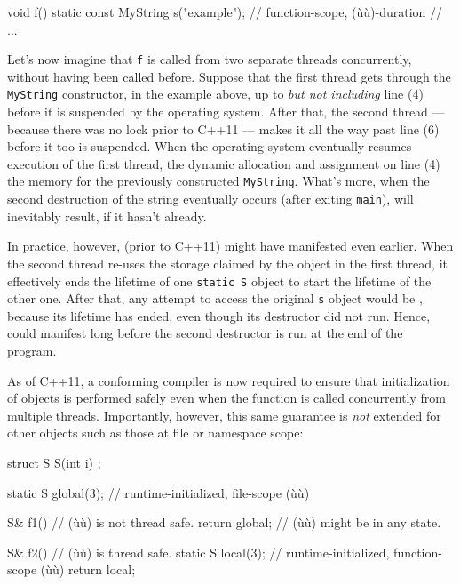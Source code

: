 \begin{emcppslisting}[emcppsbatch=e4]
void f()
{
    static const MyString s("example");  // function-scope, (ù{}ù)-duration
    // ...
}
\end{emcppslisting}

\noindent Let's now imagine that \lstinline!f! is called from
two separate threads concurrently, without having been called before. Suppose that the first thread gets
through the \lstinline!MyString! constructor, in the example above, up to
\emph{but not including} line (4) before it is suspended by the
operating system. After that, the second thread --- because there was no
lock prior to C++11 --- makes it all the way past line (6) before it too
is suspended. When the operating system eventually resumes execution of
the first thread, the dynamic allocation and assignment on line (4)
 the memory for the previously constructed
\lstinline!MyString!. What's more, when the second destruction of the
string eventually occurs (after exiting \lstinline!main!),
 will inevitably result, if it hasn't
already.

In practice, however,  (prior to C++11) might
have manifested even earlier. When the second thread re-uses the storage
claimed by the object in the first thread, it effectively ends the
lifetime of one \lstinline!static!~\lstinline!S! object to start the lifetime
of the other one. After that, any attempt to access the original
\lstinline!s! object would be , because its
lifetime has ended, even though its destructor did not run. Hence,
 could manifest long before the second
destructor is run at the end of the program.

As of C++11, a conforming compiler is now required to ensure that
initialization of  
objects is performed safely even when the function is called
concurrently from multiple threads. Importantly, however, this same
guarantee is \emph{not} extended for other 
objects such as those at file or namespace scope:

\begin{emcppshiddenlisting}[emcppsbatch=e5]
struct S {
    S(int i) {}
};
\end{emcppshiddenlisting}
\begin{emcppslisting}[emcppsbatch=e5]
static S global(3);         // runtime-initialized, file-scope (ù{}ù)

S& f1()                     // (ù{}ù) is not thread safe.
{
    return global;          // (ù{}ù) might be in any state.
}

S& f2()                     // (ù{}ù) is thread safe.
{
    static S local(3);      // runtime-initialized, function-scope (ù{}ù)
    return local;
}
\end{emcppslisting}

